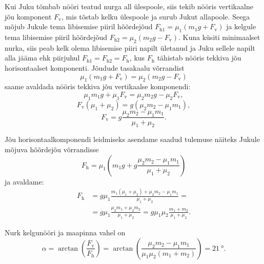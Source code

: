 \documentclass[11pt, twoside]{article}
\begin{document}
{{Kui Juku tõmbab nööri teatud nurga all ülespoole, siis tekib nööris vertikaalne jõu komponent $F_{\mathrm{v}}$, mis tõstab kelku ülespoole ja surub Jukut allapoole. Seega mõjub Jukule tema libisemise piiril hõõrdejõud $F_{\mathrm{h}1} = \mu_1 \left(m_1 g + F_{\mathrm{v}}\right)$ ja kelgule tema libisemise piiril hõõrdejõud $F_{\mathrm{h}2} = \mu_2 \left(m_2 g - F_{\mathrm{v}}\right)$. Kuna küsiti minimaalset nurka, siis peab kelk olema libisemise piiri napilt ületanud ja Juku sellele napilt alla jääma ehk piirjuhul $F_{\mathrm{h}1} = F_{\mathrm{h}2} = F_{\mathrm{h}}$, kus $F_{\mathrm{h}}$ tähistab nööris tekkiva jõu horisontaalset komponenti.
Jõudude tasakaalu võrrandist
\begin{equation*}
\mu_1 \left(m_1 g + F_{\mathrm{v}}\right) = \mu_2 \left(m_2 g - F_{\mathrm{v}}\right)
\end{equation*}
saame avaldada nööris tekkiva jõu vertikaalse komponendi:
\begin{equation*}
\mu_1 m_1 g + \mu_1 F_{\mathrm{v}} = \mu_2 m_2 g - \mu_2 F_{\mathrm{v}},
\end{equation*}
\begin{equation*}
F_{\mathrm{v}} \left(\mu_1 + \mu_2\right) = g\left(\mu_2 m_2 - \mu_1 m_1\right),
\end{equation*}
\begin{equation*}
F_{\mathrm{v}} = g\frac{\mu_2 m_2 - \mu_1 m_1}{\mu_1 + \mu_2}.
\end{equation*}

Jõu horisontaalkomponendi leidmiseks asendame saadud tulemuse näiteks Jukule mõjuva hõõrdejõu võrrandisse
\begin{equation*}
F_{\mathrm{h}} = \mu_1 \left(m_1 g + g\frac{\mu_2 m_2 - \mu_1 m_1}{\mu_1 + \mu_2}\right)
\end{equation*}
ja avaldame:
\begin{align*}
F_{\mathrm{h}} &= g \mu_1 \frac{m_1 \left(\mu_1 + \mu_2\right) + \mu_2 m_2 - \mu_1 m_1}{\mu_1 + \mu_2} = \\
&= g \mu_1 \frac{\mu_2 m_1 + \mu_2 m_2}{\mu_1 + \mu_2} = g\mu_1\mu_2\frac{m_1+m_2}{\mu_1+\mu_2}.
\end{align*}

Nurk kelgunööri ja maapinna vahel on
\begin{equation*}
\alpha = \arctan\left(\frac{F_{\mathrm{v}}}{F_{\mathrm{h}}}\right) = \arctan\left(\frac{\mu_2 m_2 - \mu_1 m_1}{\mu_1 \mu_2 \left(m_1 + m_2\right)}\right) = \SI{21}{\degree}.
\end{equation*}
\fi
}

}
\end{document}
